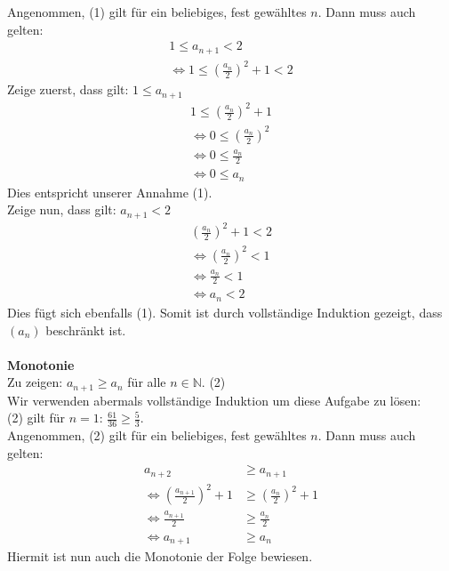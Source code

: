 \documentclass [a4paper,11pt]{article}
\begin{document}
\begin{enumerate}
                Angenommen, (1) gilt für ein beliebiges, fest gewähltes $n$. Dann muss auch gelten:\\
                \begin{align}
                    1 \leq a_{n+1} < 2 \\
                    \Leftrightarrow 1 \leq ( \frac{a_n}{2} )^2 + 1 < 2
                \end{align}
                Zeige zuerst, dass gilt: $1 \leq a_{n+1}$
                \begin{align}
                    1 \leq ( \frac{a_n}{2} )^2 + 1 \\
                    \Leftrightarrow 0 \leq ( \frac{a_n}{2} )^2 \\
                    \Leftrightarrow 0 \leq \frac{a_n}{2} \\
                    \Leftrightarrow 0 \leq a_n
                \end{align}
                Dies entspricht unserer Annahme (1).\\
                Zeige nun, dass gilt: $a_{n+1} < 2$
                \begin{align}
                    ( \frac{a_n}{2} )^2 + 1 < 2 \\
                    \Leftrightarrow ( \frac{a_n}{2} )^2 < 1 \\
                    \Leftrightarrow \frac{a_n}{2} < 1 \\
                    \Leftrightarrow a_n < 2
                \end{align}
                Dies fügt sich ebenfalls (1). Somit ist durch vollständige Induktion gezeigt, dass $(a_n)$ beschränkt ist. \\
                \\
            \textbf{Monotonie}\\
                Zu zeigen: $a_{n+1} \geq a_n$ für alle $n \in \mathbb{N}$. (2)\\
                Wir verwenden abermals vollständige Induktion um diese Aufgabe zu lösen: \\
                (2) gilt für $n=1$: $\frac{61}{36} \geq \frac{5}{3}$. \\
                Angenommen, (2) gilt für ein beliebiges, fest gewähltes $n$. Dann muss auch gelten:
                \begin{align}
                    a_{n+2} &\geq a_{n+1} \\
                    \Leftrightarrow ( \frac{a_{n+1}}{2} )^2 + 1 &\geq ( \frac{a_n}{2} )^2 + 1 \\
                    \Leftrightarrow \frac{a_{n+1}}{2} &\geq \frac{a_n}{2} \\
                    \Leftrightarrow a_{n+1} &\geq a_n
                \end{align}
                Hiermit ist nun auch die Monotonie der Folge bewiesen.
            
            

    \end{enumerate}
\end{document}
